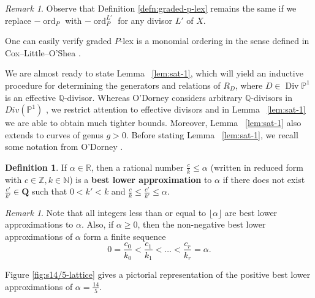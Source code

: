 \documentclass{amsart}
\theoremstyle{plain}
\theoremstyle{definition}
\newtheorem{defn}[thm]{Definition}
\theoremstyle{remark}
\newtheorem{rem}[thm]{Remark}
\numberwithin{equation}{section}
\newcommand\BN{{\mathbb N}}
\newcommand\BR{{\mathbb R}}
\newcommand\BQ{{\mathbb Q}}
\newcommand\BP{{\mathbb P}}
\newcommand\BZ{{\mathbb Z}}
\DeclareMathOperator{\ord}{ord}
\DeclareMathOperator\di{Div}
\newcommand{\halfcan}{L}
\begin{document}
\begin{rem}\label{rem:graded-P-lex-independent-of-line-bundle}
Observe that Definition \ref{defn:graded-p-lex} remains the same if we replace $-\ord_P$ with $-\ord_P^{L'}$ for any divisor $\halfcan'$ of $X$.
\end{rem}

\noindent One can easily verify graded $P$-lex is a monomial ordering in the sense defined in Cox--Little--O'Shea \cite[Chapter 2, $\mathsection$ 2, Definition 1]{cls:ideals-varieties-algorithms}.

We are almost ready to state Lemma ~\ref{lem:sat-1}, which will yield an inductive procedure for determining the generators and relations of $R_D$, where $D \in \di \BP^1$ is an effective $
\BQ$-divisor. Whereas O'Dorney considers arbitrary $\BQ$-divisors in $Div(\mathbb{P}^1)$ \cite[Theorem 8]{dorney:canonical}, we restrict attention to effective divisors and in Lemma ~\ref{lem:sat-1} we are able to obtain much tighter bounds.  Moreover, Lemma ~\ref{lem:sat-1} also extends to curves of genus $g > 0$. Before stating Lemma ~\ref{lem:sat-1}, we recall some notation from O'Dorney \cite{dorney:canonical}.

\begin{defn}
\label{defn:lower-approximation}
If $\alpha \in \BR$, then a rational number $\frac{c}{k} \leq \alpha
$ (written in reduced form with $c \in \BZ, k \in \BN$) is a
\textbf{best lower approximation} to $\alpha$ if there does not
exist $\frac{c'}{k'}\in \mathbf{Q}$ such that $0 < k'< k$ and
$\frac{c}{k} \le \frac{c'}{k'} \le \alpha$. 
\end{defn}

\begin{rem}
\label{rem:lower-approximation}
Note that all integers less than or equal to $\lfloor \alpha \rfloor$
are best lower approximations to $\alpha$. Also, if $\alpha \ge 0$,
then the non-negative best lower approximations of
$\alpha$ form a finite sequence
\[
	0 = \frac{c_0}{k_0} < \frac{c_1}{k_1} < \ldots < \frac{c_r}{k_r} = \alpha.
\]

\noindent
Figure \ref{fig:s14/5-lattice} gives a pictorial representation of the positive best lower approximations of $\alpha = \frac{14}{5}$.
\end{rem}
\end{document}
